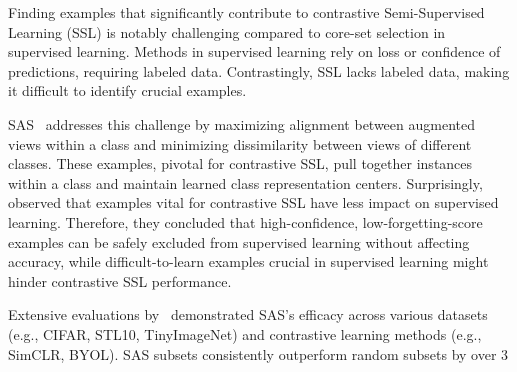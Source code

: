 Finding examples that significantly contribute to contrastive Semi-Supervised Learning (SSL) is notably challenging compared to core-set selection in supervised learning. Methods in supervised learning rely on loss or confidence of predictions, requiring labeled data. Contrastingly, SSL lacks labeled data, making it difficult to identify crucial examples.

SAS~\cite{pmlr-v202-joshi23b} addresses this challenge by maximizing alignment between augmented views within a class and minimizing dissimilarity between views of different classes. These examples, pivotal for contrastive SSL, pull together instances within a class and maintain learned class representation centers. Surprisingly,~\cite{pmlr-v202-joshi23b} observed that examples vital for contrastive SSL have less impact on supervised learning. Therefore, they concluded that high-confidence, low-forgetting-score examples can be safely excluded from supervised learning without affecting accuracy, while difficult-to-learn examples crucial in supervised learning might hinder contrastive SSL performance.

Extensive evaluations by~\cite{pmlr-v202-joshi23b} demonstrated SAS's efficacy across various datasets (e.g., CIFAR, STL10, TinyImageNet) and contrastive learning methods (e.g., SimCLR, BYOL). SAS subsets consistently outperform random subsets by over 3%
